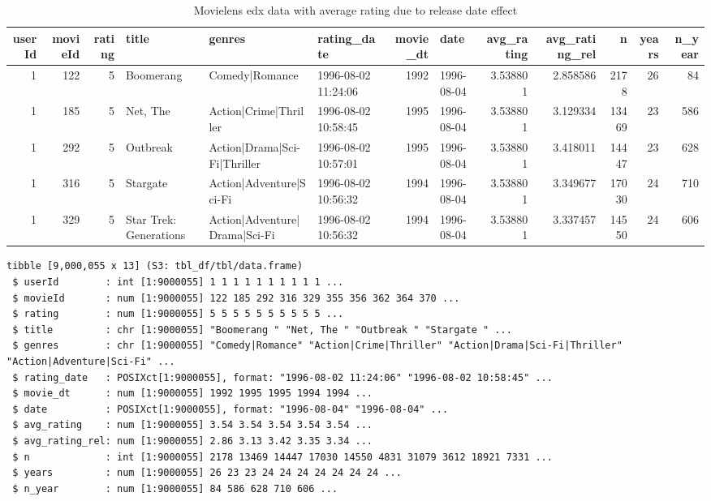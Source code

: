 \documentclass[
]{article}
\begin{document}
\begin{table}[H]

\caption{\label{tab:md_6}Movielens edx data with average rating due to release date effect\label{tbl:movielens_edx_avg_release_date_effect}}
\centering
\fontsize{4}{6}\selectfont
\begin{tabular}[t]{rrrlllrlrrrrr}
\toprule
userId & movieId & rating & title & genres & rating\_date & movie\_dt & date & avg\_rating & avg\_rating\_rel & n & years & n\_year\\
\midrule
1 & 122 & 5 & Boomerang & Comedy|Romance & 1996-08-02 11:24:06 & 1992 & 1996-08-04 & 3.538801 & 2.858586 & 2178 & 26 & 84\\
1 & 185 & 5 & Net, The & Action|Crime|Thriller & 1996-08-02 10:58:45 & 1995 & 1996-08-04 & 3.538801 & 3.129334 & 13469 & 23 & 586\\
1 & 292 & 5 & Outbreak & Action|Drama|Sci-Fi|Thriller & 1996-08-02 10:57:01 & 1995 & 1996-08-04 & 3.538801 & 3.418011 & 14447 & 23 & 628\\
1 & 316 & 5 & Stargate & Action|Adventure|Sci-Fi & 1996-08-02 10:56:32 & 1994 & 1996-08-04 & 3.538801 & 3.349677 & 17030 & 24 & 710\\
1 & 329 & 5 & Star Trek: Generations & Action|Adventure|Drama|Sci-Fi & 1996-08-02 10:56:32 & 1994 & 1996-08-04 & 3.538801 & 3.337457 & 14550 & 24 & 606\\
\bottomrule
\end{tabular}
\end{table}

\begin{verbatim}
tibble [9,000,055 x 13] (S3: tbl_df/tbl/data.frame)
 $ userId        : int [1:9000055] 1 1 1 1 1 1 1 1 1 1 ...
 $ movieId       : num [1:9000055] 122 185 292 316 329 355 356 362 364 370 ...
 $ rating        : num [1:9000055] 5 5 5 5 5 5 5 5 5 5 ...
 $ title         : chr [1:9000055] "Boomerang " "Net, The " "Outbreak " "Stargate " ...
 $ genres        : chr [1:9000055] "Comedy|Romance" "Action|Crime|Thriller" "Action|Drama|Sci-Fi|Thriller" "Action|Adventure|Sci-Fi" ...
 $ rating_date   : POSIXct[1:9000055], format: "1996-08-02 11:24:06" "1996-08-02 10:58:45" ...
 $ movie_dt      : num [1:9000055] 1992 1995 1995 1994 1994 ...
 $ date          : POSIXct[1:9000055], format: "1996-08-04" "1996-08-04" ...
 $ avg_rating    : num [1:9000055] 3.54 3.54 3.54 3.54 3.54 ...
 $ avg_rating_rel: num [1:9000055] 2.86 3.13 3.42 3.35 3.34 ...
 $ n             : int [1:9000055] 2178 13469 14447 17030 14550 4831 31079 3612 18921 7331 ...
 $ years         : num [1:9000055] 26 23 23 24 24 24 24 24 24 24 ...
 $ n_year        : num [1:9000055] 84 586 628 710 606 ...
\end{verbatim}
\end{document}
